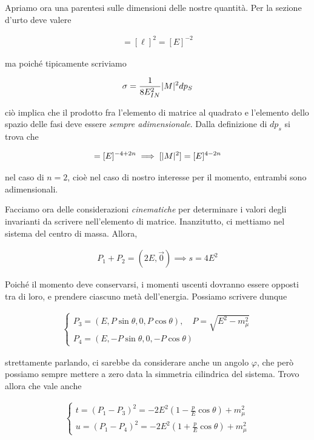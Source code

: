 \documentclass[11pt]{report}
\begin{document}
Apriamo ora una parentesi sulle dimensioni delle nostre quantità. Per la sezione d'urto deve valere 

\begin{align}
    [\sigma] = [\ell]^2 = [E]^{-2}
\end{align}

ma poiché tipicamente scriviamo 

\begin{align}
    \sigma = \frac{1}{8E_{IN}^2}\lvert M\rvert^2dp_{S}
\end{align}

ciò implica che il prodotto fra l'elemento di matrice al quadrato e l'elemento dello spazio delle fasi deve essere \emph{sempre adimensionale}. Dalla definizione di \(dp_s\) si trova che 

\begin{align}
    [dp_S] = [E]^{-4+2n} \implies [\abs{M}^2] = [E]^{4-2n}
\end{align}

nel caso di \(n=2\), cioè nel caso di nostro interesse per il momento, entrambi sono adimensionali. 


Facciamo ora delle considerazioni \emph{cinematiche} per determinare i valori degli invarianti da scrivere nell'elemento di matrice. Inanzitutto, ci mettiamo nel sistema del centro di massa. Allora, 

\begin{align}
    P_1 + P_2 = (2E, \vec{0}) \implies s = 4E^2
\end{align}

Poiché il momento deve conservarsi, i momenti uscenti dovranno essere opposti tra di loro, e prendere ciascuno metà dell'energia. Possiamo scrivere dunque 

\begin{align}
    \begin{cases}
        P_3 = (E, P\sin\theta, 0, P\cos\theta), \quad P = \sqrt{E^2 - m^2_\mu} \\
        P_4 = (E, -P\sin\theta, 0, -P\cos\theta)
    \end{cases} 
\end{align}

strettamente parlando, ci sarebbe da considerare anche un angolo \(\varphi\), che però possiamo sempre mettere a zero data la simmetria cilindrica del sistema. Trovo allora che vale anche 

\begin{align}
    \begin{cases}
        t = (P_1-P_3)^2 = -2E^2\left(1 - \frac{p}{E}\cos\theta\right) + m_\mu^2 \\
        u = (P_1 - P_4)^2 = -2E^2\left(1 + \frac{p}{E}\cos\theta\right) + m_\mu^2 
    \end{cases}
\end{align}
\end{document}
